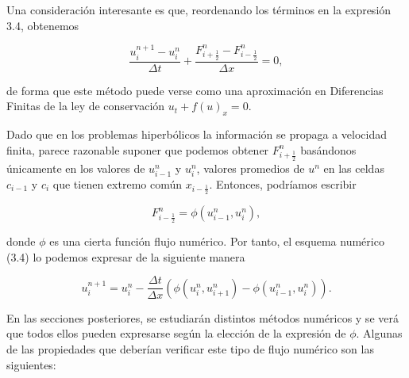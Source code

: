 Una consideración interesante es que, reordenando los términos en la
expresión 3.4, obtenemos

\begin{equation*}
  \frac{u^{n+1}_{i}-u^{n}_{i}}{\Delta t}+
  \frac{F^{n}_{i+\frac{1}{2}}-F^{n}_{i-\frac{1}{2}}}{\Delta x}=
  0,
\end{equation*}

de forma que este método puede verse como una aproximación en
Diferencias Finitas de la ley de conservación
$u_{t}+f\left(u\right)_{x}=0$.

Dado que en los problemas hiperbólicos la información se propaga a
velocidad finita, parece razonable suponer que podemos obtener
$F^{n}_{i+\frac{1}{2}}$ basándonos únicamente en los valores de
$u^{n}_{i-1}$ y $u^{n}_{i}$, valores promedios de $u^{n}$ en las
celdas $c_{i-1}$ y $c_{i}$ que tienen extremo común
$x_{i-\frac{1}{2}}$.
Entonces, podríamos escribir

\begin{equation*}
  F^{n}_{i-\frac{1}{2}}=
  \phi
  \left(
  u^{n}_{i-1},
  u^{n}_{i}
  \right),
\end{equation*}

donde $\phi$ es una cierta función flujo numérico.
Por tanto, el esquema numérico (3.4) lo podemos expresar de la
siguiente manera

\begin{equation*}
  u^{n+1}_{i}=
  u^{n}_{i}-
  \frac{\Delta t}{\Delta x}
  \left(
  \phi\left(u^{n}_{i},u^{n}_{i+1}\right)-
  \phi\left(u^{n}_{i-1},u^{n}_{i}\right)
  \right).
\end{equation*}

En las secciones posteriores, se estudiarán distintos métodos
numéricos y se verá que todos ellos pueden expresarse según la
elección de la expresión de $\phi$.
Algunas de las propiedades que deberían verificar este tipo de flujo
numérico son las siguientes:

